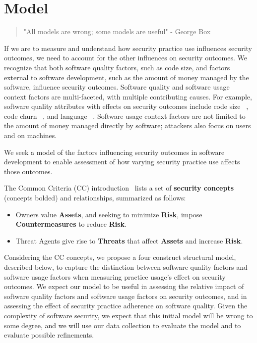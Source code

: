 \section{Model}
\label{sec:model}
\begin{quotation}
	"All models are wrong; some models are useful" - George Box
\end{quotation}


 If we are to measure and understand how security practice use influences security outcomes, we need to account for the other influences on security outcomes. We recognize that both software quality factors, such as code size, and factors external to software development, such as the amount of money managed by the software, influence security outcomes. Software quality and software usage context factors are multi-faceted, with multiple contributing causes. For example, software quality attributes with effects on security outcomes include code size ~\cite{alhazmi2007measuring}, code churn ~\cite{shin2011evaluating}, and language ~\cite{ray2014a}. Software usage context factors are not limited to the amount of money managed directly by software; attackers also focus on users and on machines. 
 
 We seek a model of the factors influencing security outcomes in software development to enable assessment of how varying security practice use affects those outcomes. 
 
 The Common Criteria (CC) introduction~\cite{common2012common} lists a set of \textbf{security concepts} (concepts bolded) and relationships, summarized as follows:
 \begin{itemize}
 	\item  Owners value \textbf{Assets}, and seeking to minimize \textbf{Risk}, impose \textbf{Countermeasures} to reduce \textbf{Risk}.
 	\item Threat Agents give rise to \textbf{Threats} that affect \textbf{Assets} and increase \textbf{Risk}.
 \end{itemize}
 
 Considering the CC concepts, we propose a four construct structural model, described below, to capture the distinction between software quality factors and software usage factors when measuring practice usage's effect on security outcomes. We expect our model to be useful in assessing the relative impact of software quality factors and software usage factors on security outcomes, and in assessing the effect of security practice adherence on software quality. Given the complexity of software security, we expect that this initial model will be wrong to some degree, and we will use our data collection to evaluate the model and to evaluate possible refinements.

